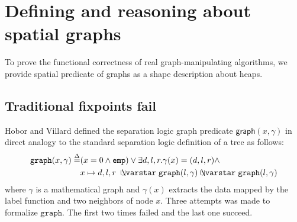 \section{Defining and reasoning about spatial graphs}

To prove the functional correctness of real graph-manipulating
algorithms, we provide spatial predicate of graphs as a shape
description about heaps.



\subsection{Traditional fixpoints fail}

Hobor and Villard\cite{hobor:ramification} defined the separation
logic graph predicate $\mathsf{graph}(x,\gamma)$ in direct analogy to
the standard separation logic definition of a tree as follows:
\begin{equation*}\label{eqn:graph}
  \begin{split}
  \mathtt{graph}(x, \gamma)\stackrel{\Delta}{=} & (x = 0 \wedge \mathtt{emp}) \vee
  \exists d,l,r . \gamma(x)=(d,l,r) \wedge \\ & x \mapsto d,l,r\;
  \ocon \mathtt{graph}(l, \gamma) \ocon \mathtt{graph}(l, \gamma)
  \end{split}
\end{equation*}
where $\gamma$ is a mathematical graph and $\gamma(x)$ extracts the
data mapped by the label function and two neighbors of node $x$. Three
attempts was made to formalize $\mathtt{graph}$. The first two times
failed and the last one succeed.



